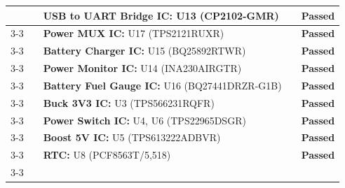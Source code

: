 \begin{longtable}{|c|p{2.5cm}|p{5cm}|p{4cm}|c|}
                & & \textbf{USB to UART Bridge IC:} U13 \newline (CP2102-GMR)
                & & \textcolor{modern_blue}{\textbf{Passed}} \\ \cline{3-3} \cline{5-5}
        
                & & \textbf{Power MUX IC:} U17 \newline (TPS2121RUXR)
                & & \textcolor{modern_blue}{\textbf{Passed}} \\ \cline{3-3} \cline{5-5}
        
                & & \textbf{Battery Charger IC:} U15 \newline (BQ25892RTWR)
                & & \textcolor{modern_blue}{\textbf{Passed}} \\ \cline{3-3} \cline{5-5}
        
                & & \textbf{Power Monitor IC:} U14 \newline (INA230AIRGTR)
                & & \textcolor{modern_blue}{\textbf{Passed}} \\ \cline{3-3} \cline{5-5}
        
                & & \textbf{Battery Fuel Gauge IC:} U16 \newline (BQ27441DRZR-G1B)
                & & \textcolor{modern_blue}{\textbf{Passed}} \\ \cline{3-3} \cline{5-5}
        
                & & \textbf{Buck 3V3 IC:} U3 \newline (TPS566231RQFR)
                & & \textcolor{modern_blue}{\textbf{Passed}} \\ \cline{3-3} \cline{5-5}
        
                & & \textbf{Power Switch IC:} U4, U6 \newline (TPS22965DSGR)
                & & \textcolor{modern_blue}{\textbf{Passed}} \\ \cline{3-3} \cline{5-5}
        
                & & \textbf{Boost 5V IC:} U5 \newline (TPS613222ADBVR)
                & & \textcolor{modern_blue}{\textbf{Passed}} \\ \cline{3-3} \cline{5-5}
        
                & & \textbf{RTC:} U8 \newline (PCF8563T/5,518)
                & & \textcolor{modern_blue}{\textbf{Passed}} \\ \cline{3-3} \cline{5-5}
        

\end{longtable}
